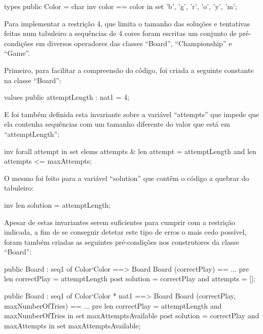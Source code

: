 \begin{vdm_al}
  types
    public Color = char
    inv color == color in set {'b', 'g', 'r', 'o', 'y', 'm'};
\end{vdm_al}

Para implementar a restrição 4, que limita o tamanho das soluções e
tentativas feitas num tabuleiro a sequências de 4 cores foram escritas
um conjunto de pré-condições em diversos operadores das classes
``Board'', ``Championship'' e ``Game''.

Primeiro, para facilitar a compreensão do código, foi criada a
seguinte constante na classe ``Board'':

\begin{vdm_al}
  values
  public attemptLength : nat1 = 4;
\end{vdm_al}

E foi também definida esta invariante sobre a variável ``attempts''
que impede que ela contenha sequências com um tamanho diferente do
valor que está em ``attemptLength'':

\begin{vdm_al}
  inv forall attempt in set elems attempts & len attempt = attemptLength and
    len attempts <= maxAttempts;
\end{vdm_al}

O mesmo foi feito para a variável ``solution'' que contêm o código a
quebrar do tabuleiro:

\begin{vdm_al}
  inv len solution = attemptLength;
\end{vdm_al}

Apesar de estas invariantes serem suficientes para cumprir com a
restrição indicada, a fim de se conseguir detetar este tipo de erros o
mais cedo possível, foram também criadas as seguintes pré-condições
nos construtores da classe ``Board'':

\begin{vdm_al}
  public Board : seq1 of Color`Color ==> Board
  Board (correctPlay) == ...
  pre len correctPlay = attemptLength
  post solution = correctPlay and
    attempts = [];
\end{vdm_al}

\begin{vdm_al}
  public Board : seq1 of Color`Color * nat1 ==> Board
  Board (correctPlay, maxNumberOfTries) == ...
  pre len correctPlay = attemptLength and
    maxNumberOfTries in set maxAttemptsAvailable
  post solution = correctPlay and
    maxAttempts in set maxAttemptsAvailable;
\end{vdm_al}

